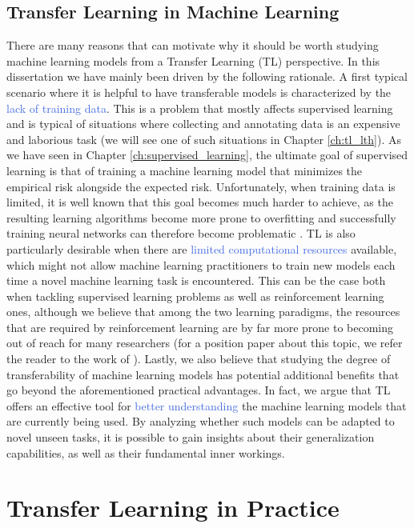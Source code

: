 \subsection{Transfer Learning in Machine Learning}
There are many reasons that can motivate why it should be worth studying machine learning models from a Transfer Learning (TL) perspective. In this dissertation we have mainly been driven by the following rationale. A first typical scenario where it is helpful to have transferable models is characterized by the \textcolor{RoyalBlue}{lack of training data}. This is a problem that mostly affects supervised learning and is typical of situations where collecting and annotating data is an expensive and laborious task (we will see one of such situations in Chapter \ref{ch:tl_lth}). As we have seen in Chapter \ref{ch:supervised_learning}, the ultimate goal of supervised learning is that of training a machine learning model that minimizes the empirical risk alongside the expected risk. Unfortunately, when training data is limited, it is well known that this goal becomes much harder to achieve, as the resulting learning algorithms become more prone to overfitting and successfully training neural networks can therefore become problematic \cite{aggarwal2018neural}. 
TL is also particularly desirable when there are \textcolor{RoyalBlue}{limited computational resources} available, which might not allow machine learning practitioners to train new models each time a novel machine learning task is encountered. This can be the case both when tackling supervised learning problems as well as reinforcement learning ones, although we believe that among the two learning paradigms, the resources that are required by reinforcement learning are by far more prone to becoming out of reach for many researchers (for a position paper about this topic, we refer the reader to the work of \citet{obando2020revisiting}).
Lastly, we also believe that studying the degree of transferability of machine learning models has potential additional benefits that go beyond the aforementioned practical advantages. In fact, we argue that TL offers an effective tool for \textcolor{RoyalBlue}{better understanding} the machine learning models that are currently being used. By analyzing whether such models can be adapted to novel unseen tasks, it is possible to gain insights about their generalization capabilities, as well as their fundamental inner workings.


\section{Transfer Learning in Practice}
\label{sec:rationale}

